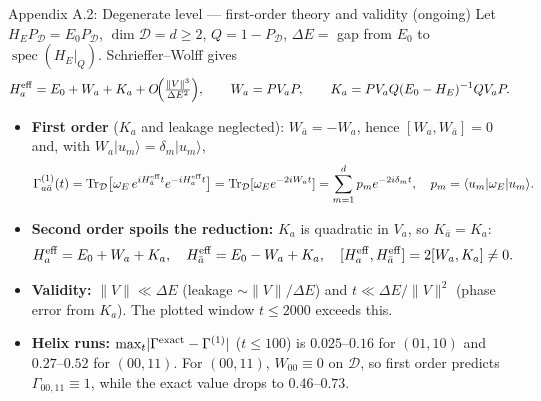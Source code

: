 \documentclass[aspectratio=169,11pt]{beamer}
\newcommand{\ket}[1]{\lvert #1\rangle}
\newcommand{\bra}[1]{\langle #1\rvert}
\newcommand{\Tr}{\operatorname{Tr}}
\newcommand{\spec}{\operatorname{spec}}
\begin{document}
\begin{frame}{Appendix A.2: Degenerate level --- first-order theory and validity (ongoing)}
\footnotesize
Let $H_EP_{\mathcal D}=E_0P_{\mathcal D}$, $\dim\mathcal D=d\ge2$, $Q=1-P_{\mathcal D}$, $\Delta E=$ gap from $E_0$ to $\spec(H_E|_Q)$. Schrieffer--Wolff gives
\[
H_a^{\mathrm{eff}}=E_0+W_a+K_a+O\!\Bigl(\tfrac{\lVert V\rVert^3}{\Delta E^2}\Bigr),\qquad
W_a=PV_aP,\qquad K_a=PV_aQ(E_0-H_E)^{-1}QV_aP .
\]
\begin{itemize}\setlength\itemsep{3pt}
\item \textbf{First order} ($K_a$ and leakage neglected): $W_{\bar a}=-W_a$, hence $[W_a,W_{\bar a}]=0$ and, with $W_a\ket{u_m}=\delta_m\ket{u_m}$,
\[
\Gamma^{(1)}_{a\bar a}(t)=\Tr_{\mathcal D}\bigl[\omega_E\,e^{iH^{\rm eff}_{\bar a}t}e^{-iH^{\rm eff}_at}\bigr]=\Tr_{\mathcal D}[\omega_Ee^{-2iW_at}]=\sum_{m=1}^dp_me^{-2i\delta_mt},\quad p_m=\bra{u_m}\omega_E\ket{u_m}.
\]
\item \textbf{Second order spoils the reduction:} $K_a$ is quadratic in $V_a$, so $K_{\bar a}=K_a$:
\[
H^{\rm eff}_a=E_0+W_a+K_a,\quad H^{\rm eff}_{\bar a}=E_0-W_a+K_a,\quad [H^{\rm eff}_a,H^{\rm eff}_{\bar a}]=2[W_a,K_a]\neq0 .
\]
\item \textbf{Validity:} $\lVert V\rVert\ll\Delta E$ (leakage $\sim\lVert V\rVert/\Delta E$) and $t\ll\Delta E/\lVert V\rVert^2$ (phase error from $K_a$). The plotted window $t\le2000$ exceeds this.
\item \textbf{Helix runs:} $\max_t\lvert\Gamma^{\rm exact}-\Gamma^{(1)}\rvert$ ($t\le100$) is $0.025$--$0.16$ for $(01,10)$ and $0.27$--$0.52$ for $(00,11)$. For $(00,11)$, $W_{00}\equiv0$ on $\mathcal D$, so first order predicts $\Gamma_{00,11}\equiv1$, while the exact value drops to $0.46$--$0.73$.
\end{itemize}
\end{frame}
\end{document}
